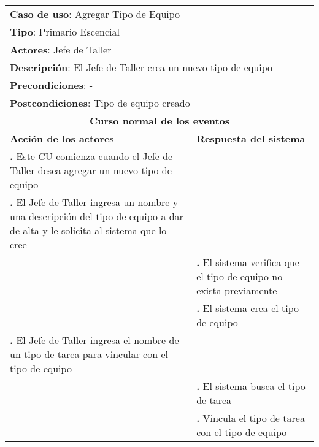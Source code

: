 \documentclass[12pt]{extarticle}
\begin{document}
    \newcommand\inc{\stepcounter{step}\textbf{\thestep. }}
    \newcommand\resetinc{\setcounter{step}{0}}
    \newcommand\raya{\noindent\rule{169mm}{0.8mm}\\}


	\begin{longtable}{ |p{8cm}|p{8cm}| }
		\hline
		\multicolumn{2}{|p{16cm}|}{\textbf{Caso de uso}: Agregar Tipo de Equipo}\\
		\multicolumn{2}{|p{16cm}|}{\textbf{Tipo}: Primario Escencial}\\
		\multicolumn{2}{|p{16cm}|}{\textbf{Actores}: Jefe de Taller}\\
		\multicolumn{2}{|p{16cm}|}{\textbf{Descripción}: El Jefe de Taller crea un nuevo tipo de equipo}\\
		\multicolumn{2}{|p{16cm}|}{\textbf{Precondiciones}: -}\\
		\multicolumn{2}{|p{16cm}|}{\textbf{Postcondiciones}: Tipo de equipo creado}\\
		\hline
		\multicolumn{2}{|c|}{\textbf{Curso normal de los eventos}}\\
		\hline
		\textbf{Acción de los actores} & \textbf{Respuesta del sistema}\\
		\hline
			\inc Este CU comienza cuando el Jefe de Taller desea agregar un nuevo tipo de equipo & \\
			\hline
            \inc  El Jefe de Taller ingresa un nombre y una descripción del tipo de equipo a dar de alta y le solicita al sistema que lo cree & \\
			\hline
            & \inc El sistema verifica que el tipo de equipo no exista previamente \\
			\hline
			& \inc El sistema crea el tipo de equipo \\
			\hline
			\inc El Jefe de Taller ingresa el nombre de un tipo de tarea para vincular con el tipo de equipo & \\
			\hline
			& \inc El sistema busca el tipo de tarea \\
			\hline
            & \inc Vincula el tipo de tarea con el tipo de equipo \\

\end{longtable}
\end{document}
